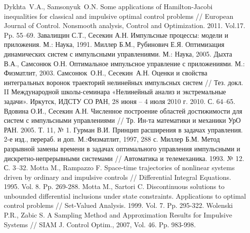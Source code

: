   \pagebreak
  \begin{thebibliography}{99}

   { Dykhta~V.A.,  Samsonyuk~O.N.}
    Some applications of Hamilton-Jacobi inequalities for classical and impulsive optimal control problems //
    European Journal of Control. Nonsmooth analysis, Control and Optimization. 2011. Vol.17. Pp. 55--69.
      { Завалищин С.Т.,   Сесекин А.Н.}  {Импульсные  процессы:  модели  и  приложения}.   М.:   Наука,  1991.
     { Миллер Б.М.,  Рубинович Е.Я.}  { Оптимизация динамических систем с импульсными управлениями}.
    М.: Наука, 2005.
    {  Дыхта В.А.,  Самсонюк О.Н.}   Оптимальное импульсное управление с приложениями.
    М.: Физматлит, 2003.
    { Самсонюк~О.Н., Сесекин~А.Н.} Оценки и свойства интегральных воронок траекторий нелинейных импульсных
    систем // Тез. докл. II Международной школы-семинара «Нелинейный анализ и экстремальные задачи». Иркутск,
    ИДСТУ СО РАН, 28 июня -- 4 июля 2010 г. 2010. С. 64--65.
    Вдовина О.И., Сесекин А.Н. Численное построение областей достижимости для систем с импульсными управлениями // Тр. Ин-та математики и механики УрО РАН.   2005. Т. 11, № 1.
    Гурман В.И. Принцип расширения в задачах управления. 2-е изд., перераб. и доп. М.:Физматлит, 1997, 288 с.
    Миллер Б.М. Метод разрывной замены времени в задачах оптимального управления импульсными и
    дискретно-непрерывными системами // Автоматика и
    телемеханика. 1993. № 12. С. 3--32.
    Motta M.,  Rampazzo F. Space-time trajectories of nonlinear systems driven by ordinary and impulsive controls //   Differential Integral Equations. 1995. Vol. 8.  Pp. 269-288.
    Motta M., Sartori C. Discontinuous solutions to unbounded differential inclusions under state constraints.  Applications to optimal control problems // Set-Valued Analysis. 1999. Vol. 7. Pp. 295-322.
    Wolenski P.R., Zabic S.  A Sampling Method and Approximation Results for Impulsive Systems // SIAM J. Control Optim., 2007, Vol. 46. Pp. 983-998.
  \end{thebibliography}


